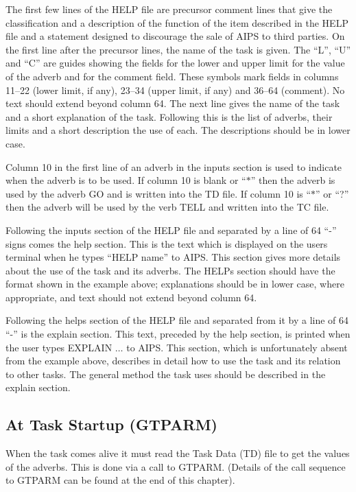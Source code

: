  The first few lines of the HELP file are precursor comment lines that
give the classification and a description of the function of the item
described in the HELP file and a statement designed to discourage the
sale of AIPS to third parties.  On the first line after the precursor
lines, the name of the task is given.  The ``L'', ``U'' and ``C'' are
guides showing the fields for the lower and upper limit for the value
of the adverb and for the comment field.  These symbols mark fields in
columns 11--22 (lower limit, if any), 23--34 (upper limit, if any) and
36--64 (comment).  No text should extend beyond column 64.  The next
line gives the name of the task and a short explanation of the task.
Following this is the list of adverbs, their limits and a short
description the use of each.  The descriptions should be in lower
case.

Column 10 in the first line of an adverb in the inputs section is used
to indicate when the adverb is to be used.  If column 10 is blank or
``$\ast$'' then the adverb is used by the adverb GO and is written into the
TD file.  If column 10 is ``$\ast$'' or ``?'' then the adverb will be used by
the verb TELL and written into the TC file.

Following the inputs section of the HELP file and separated by a line
of 64 ``-'' signs comes the help section.  This is the text which is
displayed on the users terminal when he types ``HELP name'' to AIPS.
This section gives more details about the use of the task and its
adverbs. The HELPs section should have the format shown in the example
above; explanations should be in lower case, where appropriate, and
text should not extend beyond column 64.

Following the helps section of the HELP file and separated from it by
a line of 64 ``-'' is the explain section.  This text, preceded by the
help section, is printed when the user types EXPLAIN $\ldots$ to AIPS. This
section, which is unfortunately absent from the example above,
describes in detail how to use the task and its relation to other
tasks.  The general method the task uses should be described in the
explain section.


\subsection{At Task Startup (GTPARM)}
When the task comes alive it must  read the Task Data (TD) file to get
the values of the adverbs.  This is done via a call to GTPARM.
(Details of the call sequence to GTPARM can be found at the end of
this chapter).

